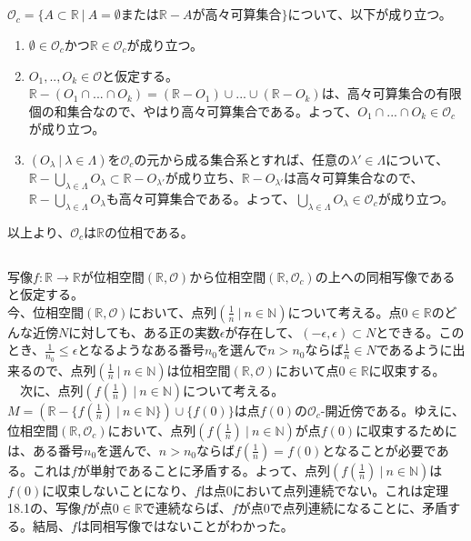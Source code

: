 \documentclass{jsarticle}
\begin{document}
\subsection{}
$\mathcal{O}_c=\{A\subset\mathbb{R}\ |\ A=\emptyset または\mathbb{R}-Aが高々可算集合\}$について、以下が成り立つ。
\begin{enumerate}
\item $\emptyset\in\mathcal{O}_c$かつ$\mathbb{R}\in\mathcal{O}_c$が成り立つ。
\item $O_1,..,O_k\in\mathcal{O}$と仮定する。$\mathbb{R}-(O_1\cap...\cap O_k)=(\mathbb{R}-O_1)\cup...\cup(\mathbb{R}-O_k)$は、高々可算集合の有限個の和集合なので、やはり高々可算集合である。よって、$O_1\cap...\cap O_k\in\mathcal{O}_c$が成り立つ。
\item $(O_\lambda\ |\ \lambda\in\Lambda)$を$\mathcal{O}_c$の元から成る集合系とすれば、任意の$\lambda'\in\Lambda$について、$\mathbb{R}-\bigcup_{\lambda\in\Lambda}O_\lambda\subset\mathbb{R}-O_{\lambda'}$が成り立ち、$\mathbb{R}-O_{\lambda'}$は高々可算集合なので、$\mathbb{R}-\bigcup_{\lambda\in\Lambda}O_\lambda$も高々可算集合である。よって、$\bigcup_{\lambda\in\Lambda}O_\lambda\in\mathcal{O}_c$が成り立つ。
\end{enumerate}
以上より、$\mathcal{O}_c$は$\mathbb{R}$の位相である。


\subsection{}
写像$f:\mathbb{R}\to\mathbb{R}$が位相空間$(\mathbb{R},\mathcal{O})$から位相空間$(\mathbb{R},\mathcal{O}_c)$の上への同相写像であると仮定する。\\
今、位相空間$(\mathbb{R},\mathcal{O})$において、点列$(\frac{1}{n}\ |\ n\in\mathbb{N})$について考える。点$0\in\mathbb{R}$のどんな近傍$N$に対しても、ある正の実数$\epsilon$が存在して、$(-\epsilon,\epsilon)\subset N$とできる。このとき、$\frac{1}{n_0}\leq\epsilon$となるようなある番号$n_0$を選んで$n>n_0$ならば$\frac{1}{n}\in N$であるように出来るので、点列$(\frac{1}{n}\ |\ n\in\mathbb{N})$は位相空間$(\mathbb{R},\mathcal{O})$において点$0\in\mathbb{R}$に収束する。\\
　次に、点列$(f(\frac{1}{n})\ |\ n\in\mathbb{N})$について考える。$M=(\mathbb{R}-\{f(\frac{1}{n})\ |\ n\in\mathbb{N}\})\cup\{f(0)\}$は点$f(0)$の$\mathcal{O}_c$-開近傍である。ゆえに、位相空間$(\mathbb{R},\mathcal{O}_c)$において、点列$(f(\frac{1}{n})\ |\ n\in\mathbb{N})$が点$f(0)$に収束するためには、ある番号$n_0$を選んで、$n>n_0$ならば$f(\frac{1}{n})=f(0)$となることが必要である。これは$f$が単射であることに矛盾する。よって、点列$(f(\frac{1}{n})\ |\ n\in\mathbb{N})$は$f(0)$に収束しないことになり、$f$は点$0$において点列連続でない。これは定理18.1の、写像$f$が点$0\in\mathbb{R}$で連続ならば、$f$が点$0$で点列連続になることに、矛盾する。結局、$f$は同相写像ではないことがわかった。
\end{document}
